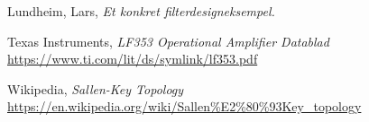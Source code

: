     Lundheim, Lars,
    \emph{Et konkret filterdesigneksempel.}

    Texas Instruments,
    \emph{LF353 Operational Amplifier Datablad}
    \url{https://www.ti.com/lit/ds/symlink/lf353.pdf}

    Wikipedia,
    \emph{Sallen-Key Topology}
    \url{https://en.wikipedia.org/wiki/Sallen\%E2\%80\%93Key\_topology}
